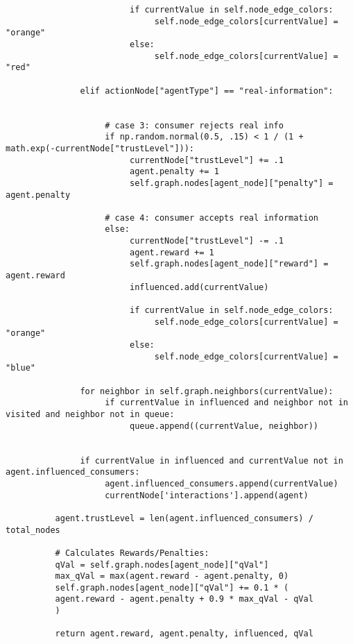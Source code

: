 \documentclass[twoside]{article}
\begin{document}
\begin{verbatim}
                         if currentValue in self.node_edge_colors:
                              self.node_edge_colors[currentValue] = "orange"
                         else:
                              self.node_edge_colors[currentValue] = "red"
                         
               elif actionNode["agentType"] == "real-information":


                    # case 3: consumer rejects real info
                    if np.random.normal(0.5, .15) < 1 / (1 + math.exp(-currentNode["trustLevel"])):
                         currentNode["trustLevel"] += .1
                         agent.penalty += 1
                         self.graph.nodes[agent_node]["penalty"] = agent.penalty
                         
                    # case 4: consumer accepts real information
                    else:
                         currentNode["trustLevel"] -= .1
                         agent.reward += 1
                         self.graph.nodes[agent_node]["reward"] = agent.reward
                         influenced.add(currentValue)

                         if currentValue in self.node_edge_colors:
                              self.node_edge_colors[currentValue] = "orange"
                         else:
                              self.node_edge_colors[currentValue] = "blue"

               for neighbor in self.graph.neighbors(currentValue):
                    if currentValue in influenced and neighbor not in visited and neighbor not in queue:
                         queue.append((currentValue, neighbor))
               

               if currentValue in influenced and currentValue not in agent.influenced_consumers:
                    agent.influenced_consumers.append(currentValue)
                    currentNode['interactions'].append(agent)

          agent.trustLevel = len(agent.influenced_consumers) / total_nodes
          
          # Calculates Rewards/Penalties:
          qVal = self.graph.nodes[agent_node]["qVal"]
          max_qVal = max(agent.reward - agent.penalty, 0)
          self.graph.nodes[agent_node]["qVal"] += 0.1 * (
          agent.reward - agent.penalty + 0.9 * max_qVal - qVal
          )

          return agent.reward, agent.penalty, influenced, qVal
\end{verbatim}
\end{document}
